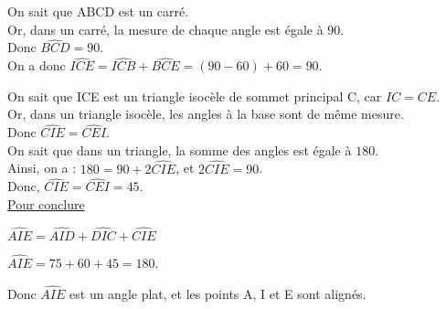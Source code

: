 On sait que ABCD est un carré. \\ Or, dans un carré, la mesure de chaque angle est égale à $90$\degre. \\ Donc $\widehat{BCD} = 90$\degre. \\

On a donc $\widehat{ICE} = \widehat{ICB} + \widehat{BCE} = \left(90 - 60\right) + 60 = 90$\degre.

On sait que ICE est un triangle isocèle de sommet principal C, car $IC = CE$. \\ Or, dans un triangle isocèle, les angles à la base sont de même mesure. \\ Donc $\widehat{CIE} = \widehat{CEI}$. \\

On sait que dans un triangle, la somme des angles est égale à $180$\degre. \\ Ainsi, on a : $180 = 90 + 2\widehat{CIE}$, et $2\widehat{CIE} = 90$\degre. \\ Donc, $\widehat{CIE} = \widehat{CEI} = 45$\degre. \\

\underline{Pour conclure}

$\widehat{AIE} = \widehat{AID} + \widehat{DIC} + \widehat{CIE} $

$\widehat{AIE} = 75 + 60 + 45 = 180$\degre.

Donc $\widehat{AIE}$ est un angle plat, et les points A, I et E sont alignés.

\ifdefined\ALIGNER
\else
    
\fi